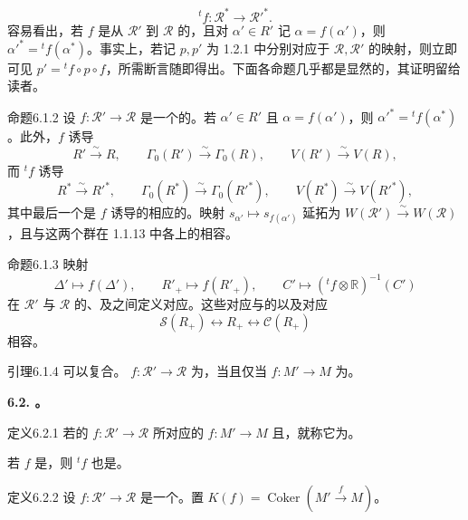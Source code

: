 \[{}^tf:\mathscr R^*\longrightarrow\mathscr R'^*.\]
容易看出，若 $f$ 是从 $\mathscr R'$ 到 $\mathscr R$ 的，且对 $\alpha'\in R'$ 记 $\alpha=f(\alpha')$，则 $\alpha'^*={}^tf(\alpha^*)$。事实上，若记 $p,p'$ 为 1.2.1 中分别对应于 $\mathscr R,\mathscr R'$ 的映射，则立即可见 $p'={}^tf\circ p\circ f$，所需断言随即得出。下面各命题几乎都是显然的，其证明留给读者。
\begin{SGAresult}{命题}{6.1.2}
设 $f:\mathscr R'\to\mathscr R$ 是一个的。若 $\alpha'\in R'$ 且 $\alpha=f(\alpha')$，则 $\alpha'^*={}^tf(\alpha^*)$。此外，$f$ 诱导
\[R'\xrightarrow\sim R,\qquad\Gamma_0(R')\xrightarrow\sim\Gamma_0(R),\qquad V(R')\xrightarrow\sim V(R),\]
而 ${}^tf$ 诱导
\[R^*\xrightarrow\sim R'^*,\qquad\Gamma_0(R^*)\xrightarrow\sim\Gamma_0(R'^*),\qquad V(R^*)\xrightarrow\sim V(R'^*),\]
其中最后一个是 $f$ 诱导的相应的。映射 $s_{\alpha'}\mapsto s_{f(\alpha')}$ 延拓为 $W(\mathscr R')\xrightarrow\sim W(\mathscr R)$，且与这两个群在 1.1.13 中各上的相容。
\end{SGAresult}
\begin{SGAresult}{命题}{6.1.3}
映射
\[\Delta'\mapsto f(\Delta'),\qquad R'_+\mapsto f(R'_+),\qquad C'\mapsto({}^tf\otimes\mathbb R)^{-1}(C')\]
在 $\mathscr R'$ 与 $\mathscr R$ 的、及之间定义对应。这些对应与的以及对应
\[\mathscr S(R_+)\longleftrightarrow R_+\longleftrightarrow\mathscr C(R_+)\]
相容。
\end{SGAresult}
\begin{SGAresult}{引理}{6.1.4}
可以复合。 $f:\mathscr R'\to\mathscr R$ 为，当且仅当 $f:M'\to M$ 为。
\end{SGAresult}
\textbf{6.2. 。}
\begin{SGAresult}{定义}{6.2.1}
若的 $f:\mathscr R'\to\mathscr R$ 所对应的 $f:M'\to M$ 且，就称它为。
\end{SGAresult}
若 $f$ 是，则 ${}^tf$ 也是。
\begin{SGAresult}{定义}{6.2.2}
设 $f:\mathscr R'\to\mathscr R$ 是一个。置 $K(f)=\operatorname{Coker}(M'\xrightarrow f M)$。
\end{SGAresult}
